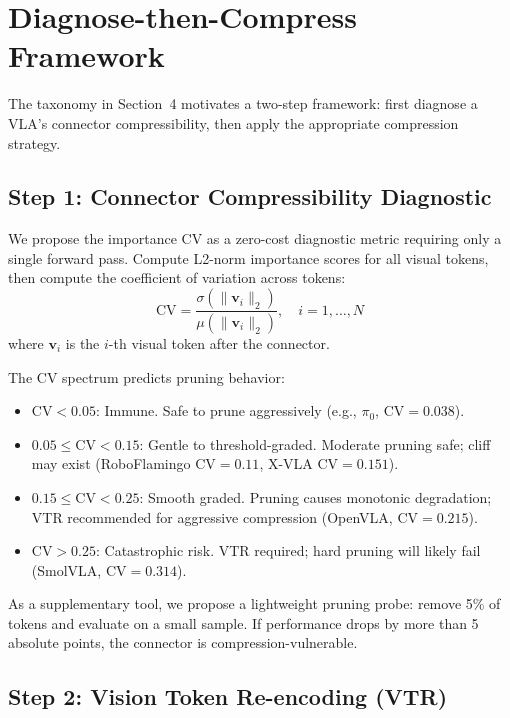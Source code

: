 \documentclass[letterpaper]{article}
\begin{document}
\section{Diagnose-then-Compress Framework}

The taxonomy in Section~4 motivates a two-step framework: first diagnose a VLA's connector compressibility, then apply the appropriate compression strategy.

\subsection{Step 1: Connector Compressibility Diagnostic}

We propose the importance CV as a zero-cost diagnostic metric requiring only a single forward pass. Compute L2-norm importance scores for all visual tokens, then compute the coefficient of variation across tokens:
\begin{equation}
\text{CV} = \frac{\sigma(\|\mathbf{v}_i\|_2)}{\mu(\|\mathbf{v}_i\|_2)}, \quad i = 1, \ldots, N
\end{equation}
where $\mathbf{v}_i$ is the $i$-th visual token after the connector.

The CV spectrum predicts pruning behavior:
\begin{itemize}
    \item $\text{CV} < 0.05$: Immune. Safe to prune aggressively (e.g., $\pi_0$, CV${}=0.038$).
    \item $0.05 \leq \text{CV} < 0.15$: Gentle to threshold-graded. Moderate pruning safe; cliff may exist (RoboFlamingo CV${}=0.11$, X-VLA CV${}=0.151$).
    \item $0.15 \leq \text{CV} < 0.25$: Smooth graded. Pruning causes monotonic degradation; VTR recommended for aggressive compression (OpenVLA, CV${}=0.215$).
    \item $\text{CV} > 0.25$: Catastrophic risk. VTR required; hard pruning will likely fail (SmolVLA, CV${}=0.314$).
\end{itemize}

As a supplementary tool, we propose a lightweight pruning probe: remove 5\% of tokens and evaluate on a small sample. If performance drops by more than 5 absolute points, the connector is compression-vulnerable.

\subsection{Step 2: Vision Token Re-encoding (VTR)}
\end{document}
